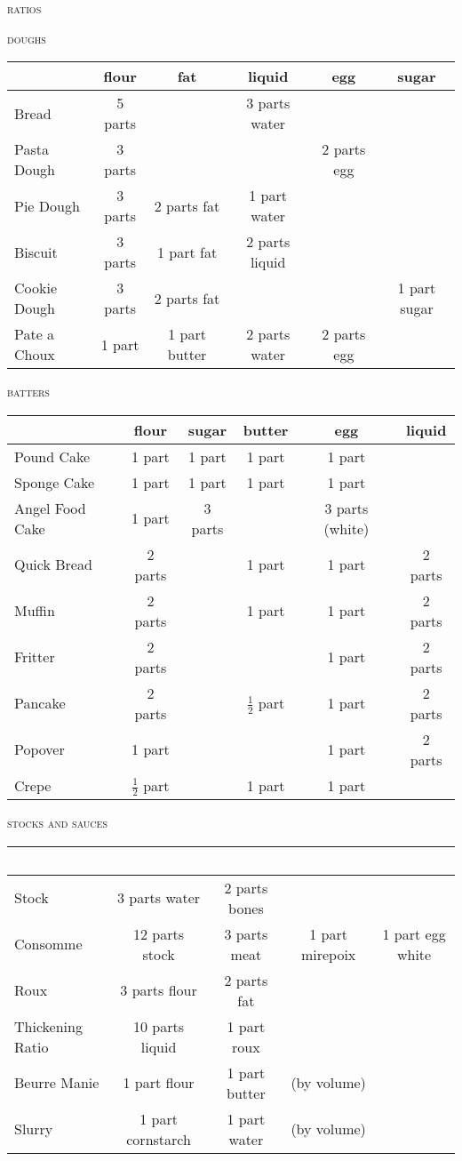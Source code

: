\documentclass[letterpaper,11pt]{article}
\newcommand{\sectionheader}[1]{
    \vspace{1.2em}
    {\small\textsc{#1}} \\
}
\begin{document}
\pagestyle{empty}

\normalsize

{\huge\scshape{ratios}}


\sectionheader{doughs}
\begin{tabular}{ l c c c c c }
\rowcolor{white}
~ & flour & fat & liquid & egg & sugar \\
\hline
Bread & 5 parts & & 3 parts water & & \\
Pasta Dough & 3 parts & & & 2 parts egg & \\
Pie Dough & 3 parts & 2 parts fat & 1 part water & & \\
Biscuit & 3 parts & 1 part fat & 2 parts liquid & & \\
Cookie Dough & 3 parts & 2 parts fat & & & 1 part sugar \\
Pate a Choux & 1 part & 1 part butter & 2 parts water & 2 parts egg & \\
\end{tabular}

\sectionheader{batters}
\begin{tabular}{ l c c c c c }
\rowcolor{white}
~ & flour & sugar & butter & egg & liquid \\
\hline
Pound Cake & 1 part & 1 part & 1 part & 1 part & \\
Sponge Cake & 1 part & 1 part & 1 part & 1 part & \\
Angel Food Cake & 1 part & 3 parts & & 3 parts (white) & \\
Quick Bread & 2 parts & & 1 part & 1 part & 2 parts \\
Muffin & 2 parts & & 1 part & 1 part & 2 parts \\
Fritter & 2 parts & & & 1 part & 2 parts \\
Pancake & 2 parts & & $\frac{1}{2}$ part & 1 part & 2 parts \\
Popover & 1 part & & & 1 part & 2 parts \\
Crepe & $\frac{1}{2}$ part & & 1 part & 1 part \\
\end{tabular}

\sectionheader{stocks and sauces}
\begin{tabular}{ l c c c c }
\rowcolor{white}
~ \\
\hline
Stock & 3 parts water & 2 parts bones & & \\
Consomme & 12 parts stock & 3 parts meat & 1 part mirepoix & 1 part egg white \\
Roux & 3 parts flour & 2 parts fat & & \\
Thickening Ratio & 10 parts liquid & 1 part roux & & \\
Beurre Manie & 1 part flour & 1 part butter & (by volume) & \\
Slurry & 1 part cornstarch & 1 part water & (by volume) & \\
\end{tabular}
\end{document}
